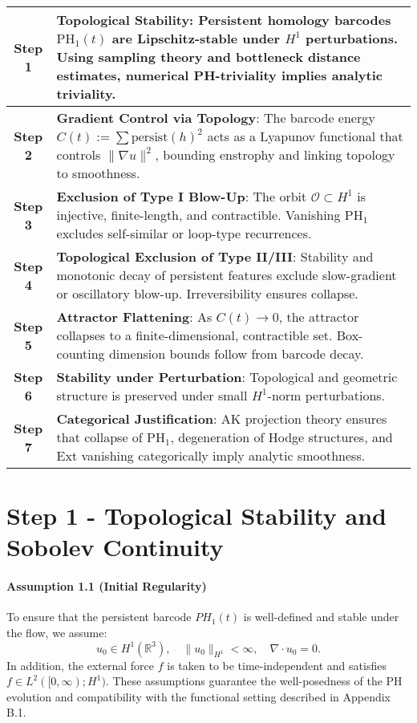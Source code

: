 \documentclass[11pt]{article}
\theoremstyle{definition}
\begin{document}
\begin{center}
\renewcommand{\arraystretch}{1.4}
\begin{tabular}{|c|p{12.5cm}|}
\hline
\textbf{Step 1} & \textbf{Topological Stability}: Persistent homology barcodes \( \mathrm{PH}_1(t) \) are Lipschitz-stable under \( H^1 \) perturbations. Using sampling theory and bottleneck distance estimates, numerical PH-triviality implies analytic triviality. \\
\hline
\textbf{Step 2} & \textbf{Gradient Control via Topology}: The barcode energy \( C(t) := \sum \mathrm{persist}(h)^2 \) acts as a Lyapunov functional that controls \( \|\nabla u\|^2 \), bounding enstrophy and linking topology to smoothness. \\
\hline
\textbf{Step 3} & \textbf{Exclusion of Type I Blow-Up}: The orbit \( \mathcal{O} \subset H^1 \) is injective, finite-length, and contractible. Vanishing \( \mathrm{PH}_1 \) excludes self-similar or loop-type recurrences. \\
\hline
\textbf{Step 4} & \textbf{Topological Exclusion of Type II/III}: Stability and monotonic decay of persistent features exclude slow-gradient or oscillatory blow-up. Irreversibility ensures collapse. \\
\hline
\textbf{Step 5} & \textbf{Attractor Flattening}: As \( C(t) \to 0 \), the attractor collapses to a finite-dimensional, contractible set. Box-counting dimension bounds follow from barcode decay. \\
\hline
\textbf{Step 6} & \textbf{Stability under Perturbation}: Topological and geometric structure is preserved under small \( H^1 \)-norm perturbations. \\
\hline
\textbf{Step 7} & \textbf{Categorical Justification}: AK projection theory ensures that collapse of \( \mathrm{PH}_1 \), degeneration of Hodge structures, and Ext vanishing categorically imply analytic smoothness. \\
\hline
\end{tabular}
\end{center}



\section{Step 1 - Topological Stability and Sobolev Continuity}

\paragraph{Assumption 1.1 (Initial Regularity)}
To ensure that the persistent barcode $PH_1(t)$ is well-defined and stable under the flow, we assume:
\[
u_0 \in H^1(\mathbb{R}^3), \quad \|u_0\|_{H^1} < \infty, \quad \nabla \cdot u_0 = 0.
\]
In addition, the external force $f$ is taken to be time-independent and satisfies $f \in L^2([0,\infty); H^1)$. These assumptions guarantee the well-posedness of the PH evolution and compatibility with the functional setting described in Appendix B.1.
\end{document}

